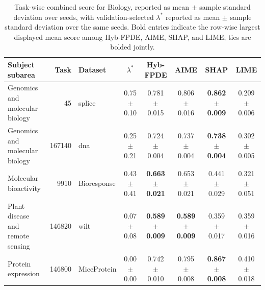 \begin{table}[!tbp]
    \caption{Task-wise combined score for Biology, reported as mean $\pm$ sample standard deviation over seeds, with validation-selected $\lambda^*$ reported as mean $\pm$ sample standard deviation over the same seeds. Bold entries indicate the row-wise largest displayed mean score among Hyb-FPDE, AIME, SHAP, and LIME; ties are bolded jointly.}
    \label{tab:taskwise_combined_scores_sd_biology}
    \centering
    \scriptsize
    \setlength{\tabcolsep}{3pt}
    \renewcommand{\arraystretch}{1.03}
    \begin{tabular}{lrlccccc}
        \toprule
        Subject subarea & Task & Dataset & $\lambda^*$ & Hyb-FPDE & AIME & SHAP & LIME  \\
        \midrule
        Genomics and molecular biology & 45 & splice & 0.75 $\pm$ 0.10 & 0.781 $\pm$ 0.015 & 0.806 $\pm$ 0.016 & \textbf{0.862 $\pm$ 0.009} & 0.209 $\pm$ 0.006 \\
        Genomics and molecular biology & 167140 & dna & 0.25 $\pm$ 0.21 & 0.724 $\pm$ 0.004 & 0.737 $\pm$ 0.004 & \textbf{0.738 $\pm$ 0.004} & 0.302 $\pm$ 0.005 \\
        Molecular bioactivity & 9910 & Bioresponse & 0.43 $\pm$ 0.41 & \textbf{0.663 $\pm$ 0.021} & 0.653 $\pm$ 0.021 & 0.441 $\pm$ 0.029 & 0.321 $\pm$ 0.051 \\
        Plant disease and remote sensing & 146820 & wilt & 0.07 $\pm$ 0.08 & \textbf{0.589 $\pm$ 0.009} & \textbf{0.589 $\pm$ 0.009} & 0.359 $\pm$ 0.017 & 0.359 $\pm$ 0.016 \\
        Protein expression & 146800 & MiceProtein & 0.00 $\pm$ 0.00 & 0.742 $\pm$ 0.010 & 0.795 $\pm$ 0.008 & \textbf{0.867 $\pm$ 0.008} & 0.410 $\pm$ 0.018 \\
        \bottomrule
    \end{tabular}%
\end{table}

